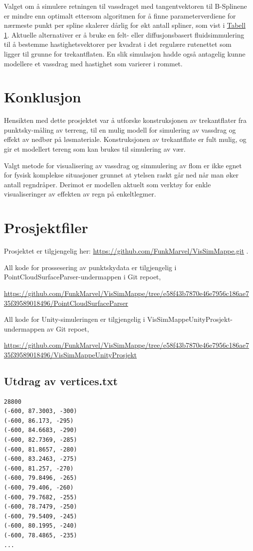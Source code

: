 \documentclass[norsk, doc, 11pt, a4paper]{apa7}  %
\begin{document}
Valget om å simulere retningen til vassdraget med tangentvektoren til B-Splinene er mindre enn optimalt ettersom algoritmen for å finne parameterverdiene for nærmeste punkt per spline skalerer dårlig for økt antall spliner, som vist i \hyperref[tab:fps]{Tabell 1}. Aktuelle alternativer er å bruke en felt- eller diffusjonsbasert fluidsimmulering til å bestemme hastighetsvektorer per kvadrat i det regulære rutenettet som ligger til grunne for trekantflaten. En slik simulasjon hadde også antagelig kunne modellere et vassdrag med hastighet som varierer i rommet.
 
\section{Konklusjon}
Hensikten med dette prosjektet var å utforske konstruksjonen av trekantflater fra punktsky-måling av terreng, til en mulig modell for simulering av vassdrag og effekt av nedbør på løsmateriale. Konstruksjonen av trekantflate er fult mulig, og gir et modellert tereng som kan brukes til simulering av vær.

Valgt metode for visualisering av vassdrag og simmulering av flom er ikke egnet for fysisk komplekse situasjoner grunnet at ytelsen raskt går ned når man øker antall regndråper. Derimot er modellen aktuelt som verktøy for enkle visualiseringer av effekten av regn på enkeltlegmer.

\newpage
\printbibliography

\appendix
\section{Prosjektfiler} \label{ap:1}
Prosjektet er tilgjengelig her: \url{https://github.com/FunkMarvel/VisSimMappe.git} .

All kode for prossesering av punktskydata er tilgjengelig i PointCloudSurfaceParser-undermappen i Git repoet,

\url{https://github.com/FunkMarvel/VisSimMappe/tree/e58f43b7870e46e7956c186ae735f39589018496/PointCloudSurfaceParser}

All kode for Unity-simuleringen er tilgjengelig i VisSimMappeUnityProsjekt-undermappen av Git repoet,

\url{https://github.com/FunkMarvel/VisSimMappe/tree/e58f43b7870e46e7956c186ae735f39589018496/VisSimMappeUnityProsjekt}

\subsection{Utdrag av vertices.txt} \label{ap:vert}
\begin{verbatim}
28800
(-600, 87.3003, -300)
(-600, 86.173, -295)
(-600, 84.6683, -290)
(-600, 82.7369, -285)
(-600, 81.8657, -280)
(-600, 83.2463, -275)
(-600, 81.257, -270)
(-600, 79.8496, -265)
(-600, 79.406, -260)
(-600, 79.7682, -255)
(-600, 78.7479, -250)
(-600, 79.5409, -245)
(-600, 80.1995, -240)
(-600, 78.4865, -235)
...
\end{verbatim}
\end{document}
